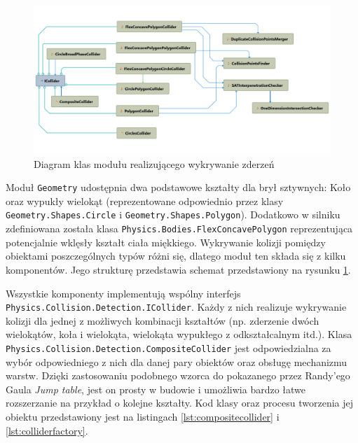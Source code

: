 \begin{figure}[h]
	\centering
	\includegraphics[width=1.1\linewidth]{images/schemat-wykrywanie-zderzen}
	\caption{Diagram klas modułu realizującego wykrywanie zderzeń}
	\label{fig:schemat-wykrywanie-zderzen}
\end{figure}

Moduł \verb|Geometry| udostępnia dwa podstawowe kształty dla brył sztywnych: Koło oraz wypukły wielokąt (reprezentowane odpowiednio przez klasy \verb|Geometry.Shapes.Circle| i \verb|Geometry.Shapes.Polygon|). Dodatkowo w silniku zdefiniowana została klasa \verb|Physics.Bodies.FlexConcavePolygon| reprezentująca potencjalnie wklęsły kształt ciała miękkiego. Wykrywanie kolizji pomiędzy obiektami poszczególnych typów różni się, dlatego moduł ten składa się z kilku komponentów. Jego strukturę przedstawia schemat przedstawiony na rysunku \ref{fig:schemat-wykrywanie-zderzen}.

Wszystkie komponenty implementują wspólny interfejs\newline
\texttt{Physics.Collision.Detection.ICollider}. Każdy z nich realizuje wykrywanie kolizji dla jednej z możliwych kombinacji kształtów (np. zderzenie dwóch wielokątów, koła i wielokąta, wielokąta wypukłego z odkształcalnym itd.). Klasa \verb|Physics.Collision.Detection.CompositeCollider| jest odpowiedzialna za wybór odpowiedniego z nich dla danej pary obiektów oraz obsługę mechanizmu warstw. Dzięki zastosowaniu podobnego wzorca do pokazanego przez Randy'ego Gaula \textit{Jump table}\cite{bib:tutsplus-frictionjumptable}, jest on prosty w budowie i umożliwia bardzo łatwe rozszerzanie na przykład o kolejne kształty. Kod klasy oraz procesu tworzenia jej obiektu przedstawiony jest na listingach \ref{lst:compositecollider} i \ref{lst:colliderfactory}.



